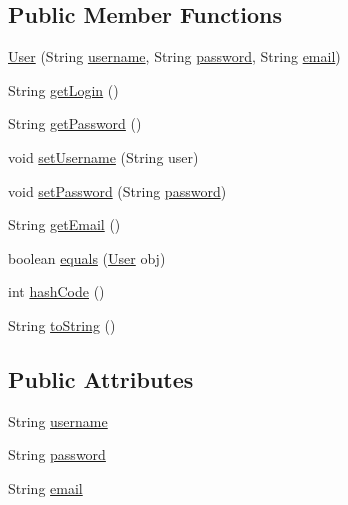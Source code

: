 \subsection*{Public Member Functions}
\begin{DoxyCompactItemize}
\item 
\hyperlink{classes_1_1deusto_1_1server_1_1jdo_1_1_user_a9c791374ed16461ebae0ed38005a8b56}{User} (String \hyperlink{classes_1_1deusto_1_1server_1_1jdo_1_1_user_aa1f05a7b487224d7c846fb81e5262c00}{username}, String \hyperlink{classes_1_1deusto_1_1server_1_1jdo_1_1_user_a9e3d470b8d2b36996759bd0595984870}{password}, String \hyperlink{classes_1_1deusto_1_1server_1_1jdo_1_1_user_a2aedb628a946e5044f27a3e6cbda31f0}{email})
\item 
String \hyperlink{classes_1_1deusto_1_1server_1_1jdo_1_1_user_aad8107ea8f9281199377f705d541bf8e}{get\+Login} ()
\item 
String \hyperlink{classes_1_1deusto_1_1server_1_1jdo_1_1_user_a1900ee126da22ed0f043e0077e8be049}{get\+Password} ()
\item 
void \hyperlink{classes_1_1deusto_1_1server_1_1jdo_1_1_user_a50b19b7520eb089012413d6072c1b7a2}{set\+Username} (String user)
\item 
void \hyperlink{classes_1_1deusto_1_1server_1_1jdo_1_1_user_a2e052b5a7cab949f61580edf44bbd233}{set\+Password} (String \hyperlink{classes_1_1deusto_1_1server_1_1jdo_1_1_user_a9e3d470b8d2b36996759bd0595984870}{password})
\item 
String \hyperlink{classes_1_1deusto_1_1server_1_1jdo_1_1_user_aa1ba6d9e3d0572b90dac6ff627ee3f95}{get\+Email} ()
\item 
boolean \hyperlink{classes_1_1deusto_1_1server_1_1jdo_1_1_user_a6488131800327e3353fd785d2db06b16}{equals} (\hyperlink{classes_1_1deusto_1_1server_1_1jdo_1_1_user}{User} obj)
\item 
int \hyperlink{classes_1_1deusto_1_1server_1_1jdo_1_1_user_aeabfaac22221c47ca92d8a60376c742c}{hash\+Code} ()
\item 
String \hyperlink{classes_1_1deusto_1_1server_1_1jdo_1_1_user_a65366a578a6dcc53e3a77d6eabbbf8cf}{to\+String} ()
\end{DoxyCompactItemize}
\subsection*{Public Attributes}
\begin{DoxyCompactItemize}
\item 
String \hyperlink{classes_1_1deusto_1_1server_1_1jdo_1_1_user_aa1f05a7b487224d7c846fb81e5262c00}{username}
\item 
String \hyperlink{classes_1_1deusto_1_1server_1_1jdo_1_1_user_a9e3d470b8d2b36996759bd0595984870}{password}
\item 
String \hyperlink{classes_1_1deusto_1_1server_1_1jdo_1_1_user_a2aedb628a946e5044f27a3e6cbda31f0}{email}
\end{DoxyCompactItemize}
